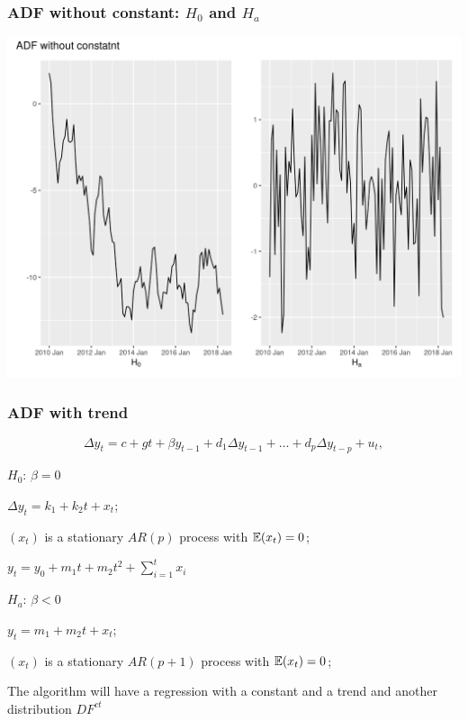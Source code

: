 \begin{frame}
	\frametitle{ADF without constant: $H_0$ and $H_a$}
	\includegraphics[width=\textwidth]{pictures/om_ts_06-055.png}
	
\end{frame}



\begin{frame}
	\frametitle{ADF with trend}
	\[
	\Delta y_t = c + g t + \beta y_{t-1} + d_1 \Delta y_{t-1} + \ldots + d_p \Delta y_{t-p} + u_t,
	\]
	
	\pause
	
	\alert{$H_0$: $\beta = 0$}
	
	$\Delta y_t = k_1 + k_2t + x_t$;
	
	$(x_t)$ is a stationary $AR(p)$ process with $\mathbb{E}(x_t) = 0$;
	
	$y_t = y_0 + m_1 t + m_2 t^2 + \sum_{i=1}^t x_i$
	
	\pause
	
	\alert{$H_a$: $\beta < 0$}
	
	$y_t = m_1 + m_2t + x_t$;
	
	$(x_t)$ is a stationary $AR(p + 1)$ process with $\mathbb{E}(x_t) = 0$;
	
	\pause
	
	The algorithm will have a regression \alert{with a constant and a trend} and another distribution $DF^{ct}$
	
\end{frame}


